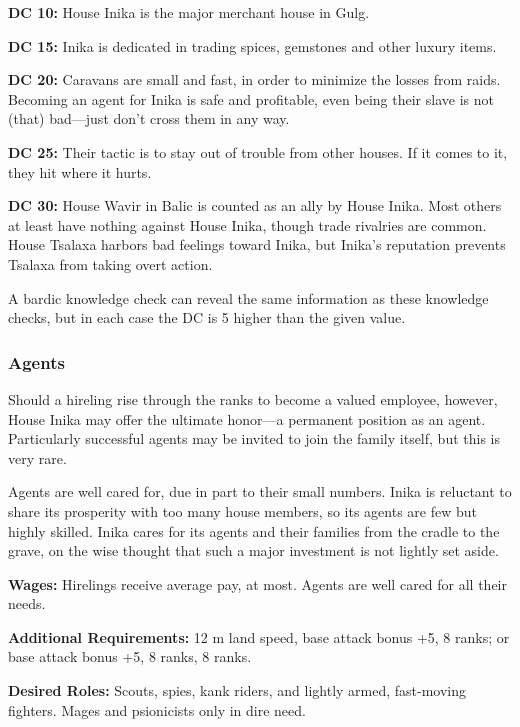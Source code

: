 \textbf{DC 10:} House Inika is the major merchant house in Gulg.

\textbf{DC 15:} Inika is dedicated in trading spices, gemstones and other luxury items.

\textbf{DC 20:} Caravans are small and fast, in order to minimize the losses from raids. Becoming an agent for Inika is safe and profitable, even being their slave is not (that) bad---just don't cross them in any way.

\textbf{DC 25:} Their tactic is to stay out of trouble from other houses.  If it comes to it, they hit where it hurts. 

\textbf{DC 30:} House Wavir in Balic is counted as an ally by House Inika. Most others at least have nothing against House Inika, though trade rivalries are common. House Tsalaxa harbors bad feelings toward Inika, but Inika's reputation prevents Tsalaxa from taking overt action.

A bardic knowledge check can reveal the same information as these knowledge checks, but in each case the DC is 5 higher than the given value.

\subsubsection{Agents}
Should a hireling rise through the ranks to become a valued employee, however, House Inika may offer the ultimate honor---a permanent position as an agent. Particularly successful agents may be invited to join the family itself, but this is very rare.

Agents are well cared for, due in part to their small numbers. Inika is reluctant to share its prosperity with too many house members, so its agents are few but highly skilled. Inika cares for its agents and their families from the cradle to the grave, on the wise thought that such a major investment is not lightly set aside.

\textbf{Wages:} Hirelings receive average pay, at most. Agents are well cared for all their needs.

\textbf{Additional Requirements:} 12 m land speed, base attack bonus +5,  8 ranks; or base attack bonus +5,  8 ranks,  8 ranks.

\textbf{Desired Roles:} Scouts, spies, kank riders, and lightly armed, fast-moving fighters. Mages and psionicists only in dire need.